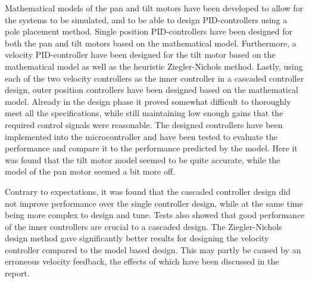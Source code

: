 \documentclass[../../main.tex]{subfiles}
\begin{document}
Mathematical models of the pan and tilt motors have been developed to allow for the systems to be simulated, and to be able to design PID-controllers using a pole placement method.
Single position PID-controllers have been designed for both the pan and tilt motors based on the mathematical model. Furthermore, a velocity PID-controller have been designed for the tilt motor based on the mathematical model as well as the heuristic Ziegler-Nichols method. Lastly, using each of the two velocity controllers as the inner controller in a cascaded controller design, outer position controllers have been designed based on the mathematical model. Already in the design phase it proved somewhat difficult to thoroughly meet all the specifications, while still maintaining low enough gains that the required control signals were reasonable.
The designed controllers have been implemented into the microcontroller and have been tested to evaluate the performance and compare it to the performance predicted by the model.
Here it was found that the tilt motor model seemed to be quite accurate, while the model of the pan motor seemed a bit more off. %

Contrary to expectations, it was found that the cascaded controller design did not improve performance over the single controller design, while at the same time being more complex to design and tune. Tests also showed that good performance of the inner controllers are crucial to a cascaded design. The Ziegler-Nichols design method gave significantly better results for designing the velocity controller compared to the model based design. This may partly be caused by an erroneous velocity feedback, the effects of which have been discussed in the report.


\end{document}
